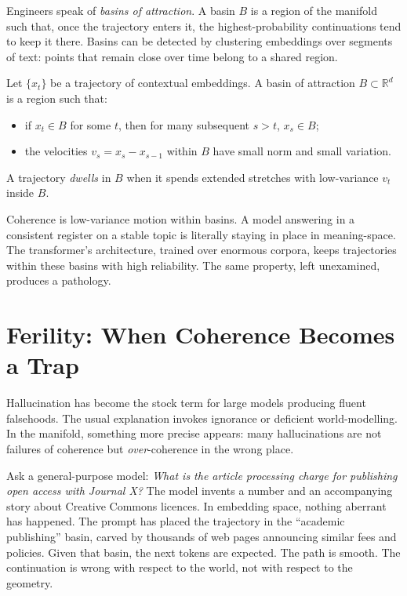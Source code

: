 \documentclass[12pt,a4paper]{article}
\begin{document}
Engineers speak of \emph{basins of attraction}. A basin $B$ is a region of the manifold such that, once the trajectory enters it, the highest-probability continuations tend to keep it there. Basins can be detected by clustering embeddings over segments of text: points that remain close over time belong to a shared region.

\begin{formalbox}[title={Basins, dwell, velocity}]
Let $\{x_t\}$ be a trajectory of contextual embeddings. A basin of attraction $B \subset \mathbb{R}^d$ is a region such that:

\begin{itemize}
\item if $x_t \in B$ for some $t$, then for many subsequent $s > t$, $x_s \in B$;
\item the velocities $v_s = x_s - x_{s-1}$ within $B$ have small norm and small variation.
\end{itemize}

A trajectory \emph{dwells} in $B$ when it spends extended stretches with low-variance $v_t$ inside $B$.
\end{formalbox}

Coherence is low-variance motion within basins. A model answering in a consistent register on a stable topic is literally staying in place in meaning-space. The transformer's architecture, trained over enormous corpora, keeps trajectories within these basins with high reliability. The same property, left unexamined, produces a pathology.

\section{Ferility: When Coherence Becomes a Trap}

Hallucination has become the stock term for large models producing fluent falsehoods. The usual explanation invokes ignorance or deficient world-modelling. In the manifold, something more precise appears: many hallucinations are not failures of coherence but \emph{over}-coherence in the wrong place.

Ask a general-purpose model: \textit{What is the article processing charge for publishing open access with Journal X?} The model invents a number and an accompanying story about Creative Commons licences. In embedding space, nothing aberrant has happened. The prompt has placed the trajectory in the ``academic publishing'' basin, carved by thousands of web pages announcing similar fees and policies. Given that basin, the next tokens are expected. The path is smooth. The continuation is wrong with respect to the world, not with respect to the geometry.
\end{document}
